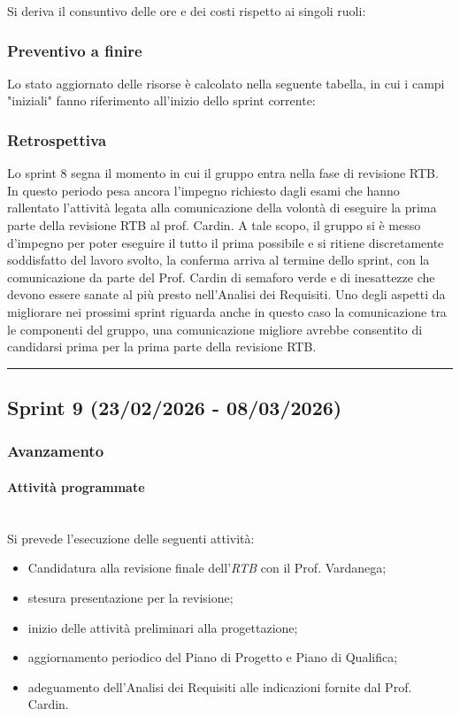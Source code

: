 \documentclass[10pt, letterpaper]{article}
\newcommand{\trisubsection}[1]{\paragraph{#1}\mbox{}\\}
\begin{document}
Si deriva il consuntivo delle ore e dei costi rispetto ai singoli ruoli:

\subsubsection{Preventivo a finire}
Lo stato aggiornato delle risorse è calcolato nella seguente tabella, in cui i campi "iniziali" fanno riferimento all'inizio dello sprint corrente:


\subsubsection{Retrospettiva}
Lo sprint 8 segna il momento in cui il gruppo entra nella fase di revisione RTB. In questo periodo pesa ancora l'impegno richiesto dagli esami 
che hanno rallentato l'attività legata alla comunicazione della volontà di eseguire la prima parte della revisione RTB al prof. Cardin. A tale scopo,
il gruppo si è messo d'impegno per poter eseguire il tutto il prima possibile e si ritiene discretamente soddisfatto del lavoro svolto, la conferma 
arriva al termine dello sprint, con la comunicazione da parte del Prof. Cardin di semaforo verde e di inesattezze che devono essere sanate al più presto 
nell'Analisi dei Requisiti. Uno degli aspetti da migliorare nei prossimi sprint riguarda anche in questo caso la comunicazione tra le componenti del gruppo, 
una comunicazione migliore avrebbe consentito di candidarsi prima per la prima parte della revisione RTB.


\vspace{1em}
\hrule
\vspace{1em}

\subsection{Sprint 9 (23/02/2026 - 08/03/2026)}
\subsubsection{Avanzamento}
\trisubsection{Attività programmate}
Si prevede l'esecuzione delle seguenti attività:
\begin{itemize}
    \item Candidatura alla revisione finale dell'\textit{RTB} con il Prof. Vardanega; 
    \item stesura presentazione per la revisione;
    \item inizio delle attività preliminari alla progettazione;
    \item aggiornamento periodico del Piano di Progetto e Piano di Qualifica;
    \item adeguamento dell'Analisi dei Requisiti alle indicazioni fornite dal Prof. Cardin.
\end{itemize}
\end{document}
